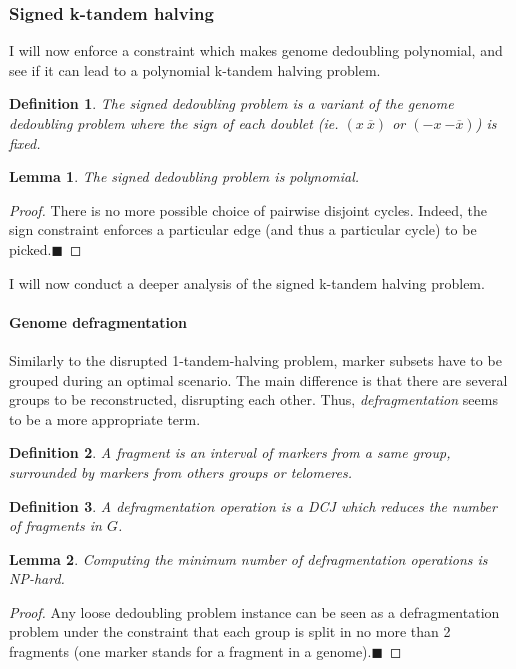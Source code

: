 \documentclass[11pt,final,twoside,nofrench]{thlifl}
\newcommand{\qed}{\ensuremath{\blacksquare}}
\newcommand{\fst}[1]{ \ensuremath{#1} }
\newcommand{\snd}[1]{ \ensuremath{\overline{#1}} }
\newcommand{\msnd}[1]{ \ensuremath{{-\overline{#1}}} }
\newcommand\aff[2]{\ensuremath{(\fst{#1}~\fst{#2})}}
\newcommand\afs[2]{\ensuremath{(\fst{#1}~\snd{#2})}}
\newtheorem{proof}{Proof}
\newtheorem{lemma}{Lemma}
\newtheorem{definition}{Definition}
\begin{document}
\subsubsection{Signed k-tandem halving} 

I will now enforce a constraint which makes genome dedoubling polynomial, and see if it can lead to a polynomial k-tandem halving problem.

\begin{definition}
The \emph{signed dedoubling problem} is a variant of the genome dedoubling problem where the sign of each doublet (ie. \afs{x}{x} or \aff{-x}{\msnd{x}}) is fixed. 
\end{definition}

\begin{lemma}
The signed dedoubling problem is polynomial.
\end{lemma}
\begin{proof}
There is no more possible choice of pairwise disjoint cycles. Indeed, the sign constraint enforces a particular edge (and thus a particular cycle) to be picked.\qed
\end{proof}

I will now conduct a deeper analysis of the signed k-tandem halving problem.

\paragraph*{Genome defragmentation}

 Similarly to the disrupted 1-tandem-halving problem, marker subsets have to be grouped during an optimal scenario. The main difference is that there are several groups to be reconstructed, disrupting each other. Thus, \emph{defragmentation} seems to be a more appropriate term.

\begin{definition}
A \emph{fragment} is an interval of markers from a same group, surrounded by markers from others groups \emph{or telomeres}.
\end{definition}

\begin{definition}
A \emph{defragmentation operation} is a DCJ which reduces the number of fragments in $G$.
\end{definition}

\begin{lemma}
\label{lem:defrag}
Computing the minimum number of defragmentation operations is NP-hard.
\end{lemma}
\begin{proof}
Any loose dedoubling problem instance can be seen as a defragmentation problem under the constraint that each group is split in no more than 2 fragments (one marker stands for a fragment in a genome).\qed 

\end{proof}
\end{document}
